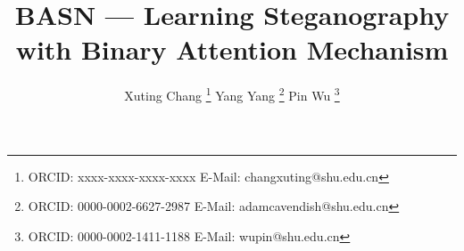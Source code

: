 \author{%
  Xuting Chang
  \thanks{ORCID: xxxx-xxxx-xxxx-xxxx E-Mail: changxuting@shu.edu.cn}
  Yang Yang
  \thanks{ORCID: 0000-0002-6627-2987 E-Mail: adamcavendish@shu.edu.cn}
  Pin Wu
  \thanks{ORCID: 0000-0002-1411-1188 E-Mail: wupin@shu.edu.cn}
}

\title{BASN --- Learning Steganography with Binary Attention Mechanism}

